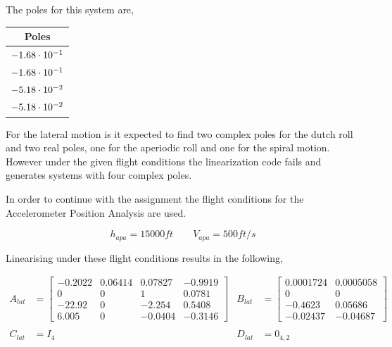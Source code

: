The poles for this system are,
\begin{center}
    \begin{tabular}{ c }
        Poles \\ \hline \hline
        $-1.68\cdot 10^{-1}$ \\
        $-1.68\cdot 10^{-1}$ \\
        $-5.18\cdot 10^{-2}$ \\
        $-5.18\cdot 10^{-2}$ \\
    \end{tabular}
\end{center}

For the lateral motion is it expected to find two complex poles for the dutch roll and two real poles, one for the aperiodic roll and one for the spiral motion. However under the given flight conditions the linearization code fails and generates systems with four complex poles.

In order to continue with the assignment the flight conditions for the Accelerometer Position Analysis are used.

\begin{equation*}
    h_{apa} = 15000ft \qquad  V_{apa}=500ft/s
\end{equation*}

Linearising under these flight conditions results in the following,

\begin{align*}
    A_{lat}&=\begin{bmatrix}
        -0.2022 & 0.06414 & 0.07827 & -0.9919 \\
              0 &       0 &       1 &  0.0781 \\
         -22.92 &       0 &  -2.254 &  0.5408 \\
          6.005 &       0 & -0.0404 & -0.3146
    \end{bmatrix} &
    B_{lat}&=\begin{bmatrix}
        0.0001724 & 0.0005058 \\
                0 &         0 \\
          -0.4623 &   0.05686 \\
         -0.02437 &  -0.04687 
    \end{bmatrix} \\\\
    C_{lat}&=I_4 &
    D_{lat}&=0_{4,2}
\end{align*}

